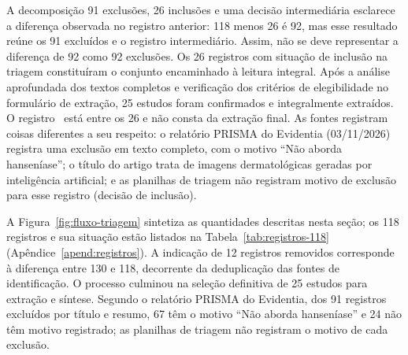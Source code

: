 A decomposição 91 exclusões, 26 inclusões e uma decisão intermediária
esclarece a diferença observada no registro anterior: 118 menos 26 é 92,
mas esse resultado reúne os 91 excluídos e o registro intermediário.
Assim, não se deve representar a diferença de 92 como 92 exclusões.
Os 26 registros com situação de inclusão na triagem constituíram o conjunto
encaminhado à leitura integral. Após a análise aprofundada dos textos completos e
verificação dos critérios de elegibilidade no formulário de extração, 25 estudos foram
confirmados e integralmente extraídos. O registro~ está entre os 26 e não consta
da extração final. As fontes registram coisas diferentes a seu respeito: o relatório PRISMA do Evidentia
(03/11/2026) registra uma exclusão em texto completo, com o motivo ``Não aborda hanseníase''; o título do
artigo trata de imagens dermatológicas geradas por inteligência artificial; e as planilhas de triagem não
registram motivo de exclusão para esse registro (decisão de inclusão).

A Figura~\ref{fig:fluxo-triagem} sintetiza as quantidades descritas nesta
seção; os 118 registros e sua situação estão listados na Tabela~\ref{tab:registros-118} (Apêndice~\ref{apend:registros}). A indicação de 12 registros removidos corresponde à diferença entre
130 e 118, decorrente da deduplicação das fontes de identificação. O processo
culminou na seleção definitiva de 25 estudos para extração e síntese.
Segundo o relatório PRISMA do Evidentia, dos 91 registros excluídos por título e resumo, 67 têm o motivo
``Não aborda hanseníase'' e 24 não têm motivo registrado; as planilhas de triagem não registram o motivo
de cada exclusão.

